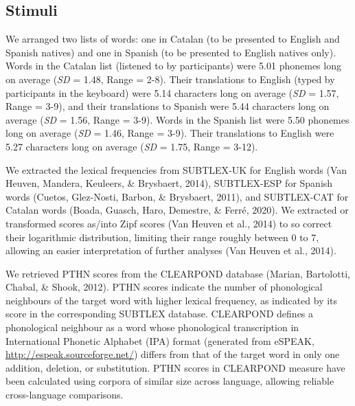 \documentclass[
  english,
  man,floatsintext]{apa6}
\begin{document}
\hypertarget{stimuli}{%
\subsection{Stimuli}\label{stimuli}}

We arranged two lists of words: one in Catalan (to be presented to English and Spanish natives) and one in Spanish (to be presented to English natives only). Words in the Catalan list (listened to by participants) were 5.01 phonemes long on average (\emph{SD} = 1.48, Range = 2-8). Their translations to English (typed by participants in the keyboard) were 5.14 characters long on average (\emph{SD} = 1.57, Range = 3-9), and their translations to Spanish were 5.44 characters long on average (\emph{SD} = 1.56, Range = 3-9). Words in the Spanish list were 5.50 phonemes long on average (\emph{SD} = 1.46, Range = 3-9). Their translations to English were 5.27 characters long on average (\emph{SD} = 1.75, Range = 3-12).

We extracted the lexical frequencies from SUBTLEX-UK for English words (Van Heuven, Mandera, Keuleers, \& Brysbaert, 2014), SUBTLEX-ESP for Spanish words (Cuetos, Glez-Nosti, Barbon, \& Brysbaert, 2011), and SUBTLEX-CAT for Catalan words (Boada, Guasch, Haro, Demestre, \& Ferré, 2020). We extracted or transformed scores as/into Zipf scores (Van Heuven et al., 2014) to so correct their logarithmic distribution, limiting their range roughly between 0 to 7, allowing an easier interpretation of further analyses (Van Heuven et al., 2014).

We retrieved PTHN scores from the CLEARPOND database (Marian, Bartolotti, Chabal, \& Shook, 2012). PTHN scores indicate the number of phonological neighbours of the target word with higher lexical frequency, as indicated by its score in the corresponding SUBTLEX database. CLEARPOND defines a phonological neighbour as a word whose phonological transcription in International Phonetic Alphabet (IPA) format (generated from eSPEAK, \url{http://espeak.sourceforge.net/}) differs from that of the target word in only one addition, deletion, or substitution. PTHN scores in CLEARPOND measure have been calculated using corpora of similar size across language, allowing reliable cross-language comparisons.
\end{document}
